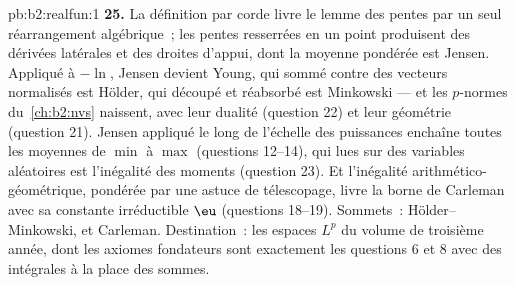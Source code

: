 \begin{solution}{pb:b2:realfun:1}
\textbf{25.} La définition par corde livre le lemme des pentes par
un seul réarrangement algébrique~; les pentes resserrées en un point
produisent des dérivées latérales et des droites d'appui, dont la
moyenne pondérée est Jensen. Appliqué à $-\ln$, Jensen devient Young,
qui sommé contre des vecteurs normalisés est Hölder, qui découpé et
réabsorbé est Minkowski --- et les $p$-normes du~\cref{ch:b2:nvs}
naissent, avec leur dualité (question 22) et leur géométrie
(question 21). Jensen appliqué le long de l'échelle des puissances
enchaîne toutes les moyennes de $\min$ à $\max$ (questions 12--14),
qui lues sur des variables aléatoires est l'inégalité des moments
(question 23). Et l'inégalité arithmético-géométrique, pondérée par
une astuce de télescopage, livre la borne de Carleman avec sa
constante irréductible $\eu$ (questions 18--19). Sommets~:
Hölder--Minkowski, et Carleman. Destination~: les espaces $L^p$
du volume de troisième année, dont les axiomes fondateurs sont
exactement les questions 6 et 8 avec des intégrales à la place des
sommes.
\end{solution}
